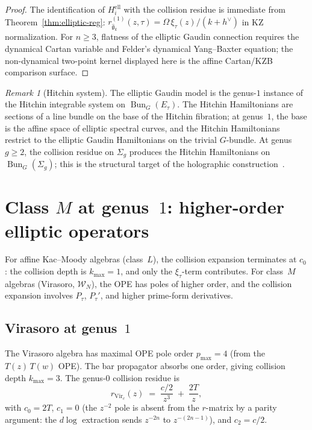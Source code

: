 \documentclass[11pt]{article}
\theoremstyle{plain}
\theoremstyle{definition}
\theoremstyle{remark}
\newtheorem{remark}[theorem]{Remark}
\newcommand{\fg}{\mathfrak{g}}
\newcommand{\cW}{\mathcal{W}}
\newcommand{\Vir}{\mathrm{Vir}}
\DeclareMathOperator{\Bun}{Bun}
\numberwithin{equation}{section}
\begin{document}
\begin{proof}
The identification of $H_i^{\mathrm{ell}}$ with the collision residue
is immediate from Theorem~\ref{thm:elliptic-reg}:
$r_{\widehat{\fg}_k}^{(1)}(z,\tau) = \Omega\,\xi_\tau(z)/(k+h^\vee)$
in KZ normalization. For \(n\geq3\), flatness of the elliptic Gaudin
connection requires the dynamical Cartan variable and Felder's
dynamical Yang--Baxter equation; the non-dynamical two-point kernel
displayed here is the affine Cartan/KZB comparison surface.
\end{proof}

\begin{remark}[Hitchin system]\label{rem:hitchin}
The elliptic Gaudin model is the genus-$1$ instance of the Hitchin
integrable system on $\Bun_G(E_\tau)$. The Hitchin Hamiltonians are
sections of a line bundle on the base of the Hitchin fibration; at
genus~$1$, the base is the affine space of elliptic spectral curves,
and the Hitchin Hamiltonians restrict to the elliptic Gaudin
Hamiltonians on the trivial $G$-bundle. At genus $g \geq 2$, the
collision residue on $\Sigma_g$ produces the Hitchin Hamiltonians on
$\Bun_G(\Sigma_g)$; this is the structural target of the holographic
construction~\cite{Lorgat26}.
\end{remark}



\section{Class $M$ at genus~$1$: higher-order elliptic
operators}\label{sec:class-m}

For affine Kac--Moody algebras (class~$L$), the collision expansion
terminates at $c_0$: the collision depth is $k_{\max} = 1$, and only
the \(\xi_\tau\)-term contributes. For class~$M$ algebras (Virasoro,
$\cW_N$), the OPE has poles of higher order, and the collision
expansion involves \(P_\tau\), \(P_\tau'\), and higher prime-form
derivatives.

\subsection{Virasoro at genus~$1$}

The Virasoro algebra has maximal OPE pole order $p_{\max} = 4$ (from
the $T(z)\,T(w)$ OPE). The bar propagator absorbs one order, giving
collision depth $k_{\max} = 3$. The genus-$0$ collision residue is
\begin{equation}\label{eq:vir-genus0}
r_{\Vir_c}(z) \;=\; \frac{c/2}{z^3} \;+\; \frac{2T}{z},
\end{equation}
with $c_0 = 2T$, $c_1 = 0$ (the $z^{-2}$ pole is absent from the
$r$-matrix by a parity argument: the $d\log$ extraction sends
$z^{-2n}$ to $z^{-(2n-1)}$), and $c_2 = c/2$.
\end{document}
